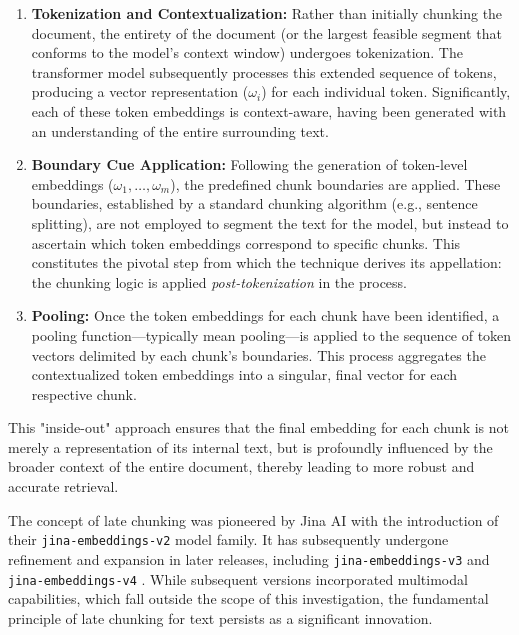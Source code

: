 \begin{enumerate}
    \item \textbf{Tokenization and Contextualization:} Rather than initially chunking the document, the entirety of the document (or the largest feasible segment that conforms to the model's context window) undergoes tokenization. The transformer model subsequently processes this extended sequence of tokens, producing a vector representation ($\omega_i$) for each individual token. Significantly, each of these token embeddings is context-aware, having been generated with an understanding of the entire surrounding text.

    \item \textbf{Boundary Cue Application:} Following the generation of token-level embeddings ($\omega_1, \dots, \omega_m$), the predefined chunk boundaries are applied. These boundaries, established by a standard chunking algorithm (e.g., sentence splitting), are not employed to segment the text for the model, but instead to ascertain which token embeddings correspond to specific chunks. This constitutes the pivotal step from which the technique derives its appellation: the chunking logic is applied \textit{post-tokenization} in the process.

    \item \textbf{Pooling:} Once the token embeddings for each chunk have been identified, a pooling function—typically mean pooling—is applied to the sequence of token vectors delimited by each chunk's boundaries. This process aggregates the contextualized token embeddings into a singular, final vector for each respective chunk.
\end{enumerate}

This "inside-out" approach ensures that the final embedding for each chunk is not merely a representation of its internal text, but is profoundly influenced by the broader context of the entire document, thereby leading to more robust and accurate retrieval.

The concept of late chunking was pioneered by Jina AI with the introduction of their \texttt{jina-embeddings-v2} model family. It has subsequently undergone refinement and expansion in later releases, including \texttt{jina-embeddings-v3} \autocite{sturua2024jinaembeddingsv3multilingualembeddingstask} and \texttt{jina-embeddings-v4} \autocite{günther2025jinaembeddingsv4universalembeddingsmultimodal}. While subsequent versions incorporated multimodal capabilities, which fall outside the scope of this investigation, the fundamental principle of late chunking for text persists as a significant innovation.

